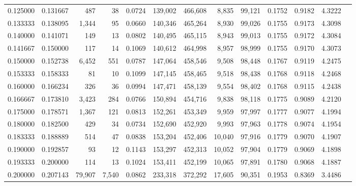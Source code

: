\begin{tabular}{rrrrrrrrrrrrr}
0.125000 & 0.131667 &    487 &     38 &                                     0.0724 & 139,002 & 466,608 &   8,835 &  99,121 & 0.1752 & 0.9182 & 4.3222 \\
0.133333 & 0.138095 &  1,344 &     95 &                                     0.0660 & 140,346 & 465,264 &   8,930 &  99,026 & 0.1755 & 0.9173 & 4.3098 \\
0.140000 & 0.141071 &    149 &     13 &                                     0.0802 & 140,495 & 465,115 &   8,943 &  99,013 & 0.1755 & 0.9172 & 4.3084 \\
0.141667 & 0.150000 &    117 &     14 &                                     0.1069 & 140,612 & 464,998 &   8,957 &  98,999 & 0.1755 & 0.9170 & 4.3073 \\
0.150000 & 0.152738 &  6,452 &    551 &                                     0.0787 & 147,064 & 458,546 &   9,508 &  98,448 & 0.1767 & 0.9119 & 4.2475 \\
0.153333 & 0.158333 &     81 &     10 &                                     0.1099 & 147,145 & 458,465 &   9,518 &  98,438 & 0.1768 & 0.9118 & 4.2468 \\
0.160000 & 0.166234 &    326 &     36 &                                     0.0994 & 147,471 & 458,139 &   9,554 &  98,402 & 0.1768 & 0.9115 & 4.2438 \\
0.166667 & 0.173810 &  3,423 &    284 &                                     0.0766 & 150,894 & 454,716 &   9,838 &  98,118 & 0.1775 & 0.9089 & 4.2120 \\
0.175000 & 0.178571 &  1,367 &    121 &                                     0.0813 & 152,261 & 453,349 &   9,959 &  97,997 & 0.1777 & 0.9077 & 4.1994 \\
0.180000 & 0.182500 &    429 &     34 &                                     0.0734 & 152,690 & 452,920 &   9,993 &  97,963 & 0.1778 & 0.9074 & 4.1954 \\
0.183333 & 0.188889 &    514 &     47 &                                     0.0838 & 153,204 & 452,406 &  10,040 &  97,916 & 0.1779 & 0.9070 & 4.1907 \\
0.190000 & 0.192857 &     93 &     12 &                                     0.1143 & 153,297 & 452,313 &  10,052 &  97,904 & 0.1779 & 0.9069 & 4.1898 \\
0.193333 & 0.200000 &    114 &     13 &                                     0.1024 & 153,411 & 452,199 &  10,065 &  97,891 & 0.1780 & 0.9068 & 4.1887 \\
0.200000 & 0.207143 & 79,907 &  7,540 &                                     0.0862 & 233,318 & 372,292 &  17,605 &  90,351 & 0.1953 & 0.8369 & 3.4486 \\

\end{tabular}
